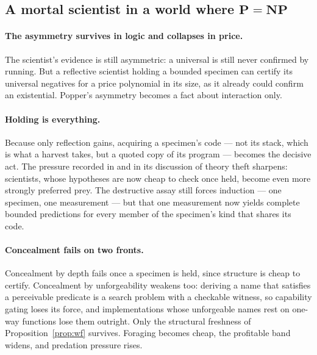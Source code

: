 \documentclass[11pt]{article}
\theoremstyle{definition}
\theoremstyle{plain}
\theoremstyle{remark}
\newcommand{\Pclass}{\mathbf{P}}
\newcommand{\NPclass}{\mathbf{NP}}
\begin{document}
\subsection{A mortal scientist in a world where \texorpdfstring{$\Pclass = \NPclass$}{P = NP}}

\paragraph{The asymmetry survives in logic and collapses in price.} The
scientist's evidence is still asymmetric: a universal is still never
confirmed by running. But a reflective scientist holding a bounded
specimen can certify its universal negatives for a price polynomial in
its size, as it already could confirm an existential. Popper's
asymmetry becomes a fact about interaction only.

\paragraph{Holding is everything.} Because only reflection gains,
acquiring a specimen's code --- not its stack, which is what a harvest
takes, but a quoted copy of its program --- becomes the decisive act.
The pressure recorded in \cite[Prop.~Scientists are preferred
prey]{Scientist} and in its discussion of theory theft sharpens:
scientists, whose hypotheses are now cheap to check once held, become
even more strongly preferred prey. The
destructive assay still forces induction --- one specimen, one
measurement --- but that one measurement now yields complete bounded
predictions for every member of the specimen's kind that shares its code.

\paragraph{Concealment fails on two fronts.} Concealment by depth fails
once a specimen is held, since structure is cheap to certify. Concealment
by unforgeability weakens too: deriving a name that satisfies a
perceivable predicate is a search problem with a checkable witness, so
capability gating loses its force, and implementations whose unforgeable
names rest on one-way functions lose them outright. Only the structural
freshness of Proposition~\ref{prop:wf} survives. Foraging becomes cheap,
the profitable band widens, and predation pressure rises.
\end{document}
